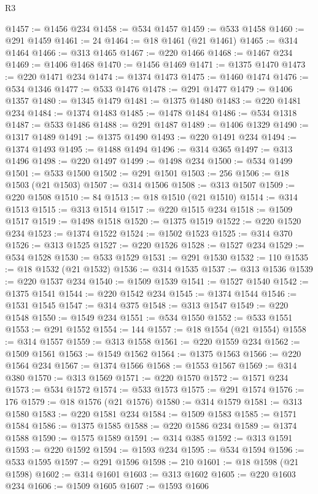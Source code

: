 \begin{lexlean}{R3}
\begin{coremodule}
@1457 := @1456 @234
@1458 := @534 @1457
@1459 := @533 @1458
@1460 := @291 @1459
@1461 := 24
@1464 := @18 @1461 (@21 @1461)
@1465 := @314 @1464
@1466 := @313 @1465
@1467 := @220 @1466
@1468 := @1467 @234
@1469 := @1406 @1468
@1470 := @1456 @1469
@1471 := @1375 @1470
@1473 := @220 @1471 @234
@1474 := @1374 @1473
@1475 := @1460 @1474
@1476 := @534 @1346
@1477 := @533 @1476
@1478 := @291 @1477
@1479 := @1406 @1357
@1480 := @1345 @1479
@1481 := @1375 @1480
@1483 := @220 @1481 @234
@1484 := @1374 @1483
@1485 := @1478 @1484
@1486 := @534 @1318
@1487 := @533 @1486
@1488 := @291 @1487
@1489 := @1406 @1329
@1490 := @1317 @1489
@1491 := @1375 @1490
@1493 := @220 @1491 @234
@1494 := @1374 @1493
@1495 := @1488 @1494
@1496 := @314 @365
@1497 := @313 @1496
@1498 := @220 @1497
@1499 := @1498 @234
@1500 := @534 @1499
@1501 := @533 @1500
@1502 := @291 @1501
@1503 := 256
@1506 := @18 @1503 (@21 @1503)
@1507 := @314 @1506
@1508 := @313 @1507
@1509 := @220 @1508
@1510 := 84
@1513 := @18 @1510 (@21 @1510)
@1514 := @314 @1513
@1515 := @313 @1514
@1517 := @220 @1515 @234
@1518 := @1509 @1517
@1519 := @1498 @1518
@1520 := @1375 @1519
@1522 := @220 @1520 @234
@1523 := @1374 @1522
@1524 := @1502 @1523
@1525 := @314 @370
@1526 := @313 @1525
@1527 := @220 @1526
@1528 := @1527 @234
@1529 := @534 @1528
@1530 := @533 @1529
@1531 := @291 @1530
@1532 := 110
@1535 := @18 @1532 (@21 @1532)
@1536 := @314 @1535
@1537 := @313 @1536
@1539 := @220 @1537 @234
@1540 := @1509 @1539
@1541 := @1527 @1540
@1542 := @1375 @1541
@1544 := @220 @1542 @234
@1545 := @1374 @1544
@1546 := @1531 @1545
@1547 := @314 @375
@1548 := @313 @1547
@1549 := @220 @1548
@1550 := @1549 @234
@1551 := @534 @1550
@1552 := @533 @1551
@1553 := @291 @1552
@1554 := 144
@1557 := @18 @1554 (@21 @1554)
@1558 := @314 @1557
@1559 := @313 @1558
@1561 := @220 @1559 @234
@1562 := @1509 @1561
@1563 := @1549 @1562
@1564 := @1375 @1563
@1566 := @220 @1564 @234
@1567 := @1374 @1566
@1568 := @1553 @1567
@1569 := @314 @380
@1570 := @313 @1569
@1571 := @220 @1570
@1572 := @1571 @234
@1573 := @534 @1572
@1574 := @533 @1573
@1575 := @291 @1574
@1576 := 176
@1579 := @18 @1576 (@21 @1576)
@1580 := @314 @1579
@1581 := @313 @1580
@1583 := @220 @1581 @234
@1584 := @1509 @1583
@1585 := @1571 @1584
@1586 := @1375 @1585
@1588 := @220 @1586 @234
@1589 := @1374 @1588
@1590 := @1575 @1589
@1591 := @314 @385
@1592 := @313 @1591
@1593 := @220 @1592
@1594 := @1593 @234
@1595 := @534 @1594
@1596 := @533 @1595
@1597 := @291 @1596
@1598 := 210
@1601 := @18 @1598 (@21 @1598)
@1602 := @314 @1601
@1603 := @313 @1602
@1605 := @220 @1603 @234
@1606 := @1509 @1605
@1607 := @1593 @1606

\end{coremodule}
\end{lexlean}
